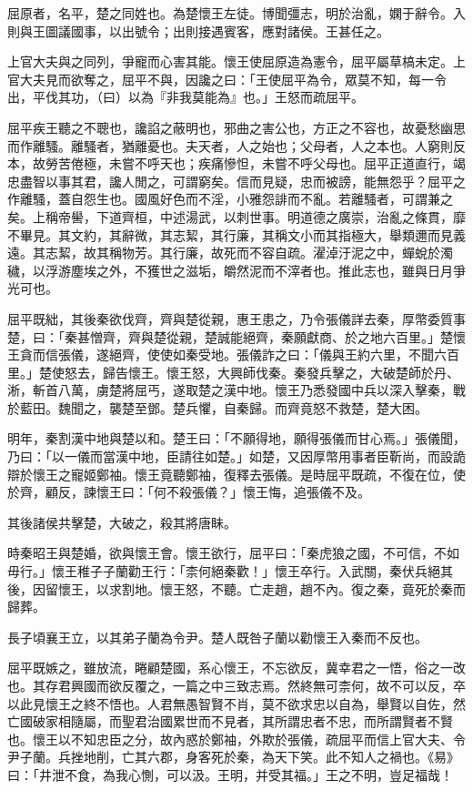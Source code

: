 
\begin{pinyinscope}
屈原者，名平，楚之同姓也。為楚懷王左徒。博聞彊志，明於治亂，嫻于辭令。入則與王圖議國事，以出號令；出則接遇賓客，應對諸侯。王甚任之。

上官大夫與之同列，爭寵而心害其能。懷王使屈原造為憲令，屈平屬草槁未定。上官大夫見而欲奪之，屈平不與，因讒之曰：「王使屈平為令，眾莫不知，每一令出，平伐其功，（曰）以為『非我莫能為』也。」王怒而疏屈平。

屈平疾王聽之不聰也，讒諂之蔽明也，邪曲之害公也，方正之不容也，故憂愁幽思而作離騷。離騷者，猶離憂也。夫天者，人之始也；父母者，人之本也。人窮則反本，故勞苦倦極，未嘗不呼天也；疾痛慘怛，未嘗不呼父母也。屈平正道直行，竭忠盡智以事其君，讒人閒之，可謂窮矣。信而見疑，忠而被謗，能無怨乎？屈平之作離騷，蓋自怨生也。國風好色而不淫，小雅怨誹而不亂。若離騷者，可謂兼之矣。上稱帝嚳，下道齊桓，中述湯武，以刺世事。明道德之廣崇，治亂之條貫，靡不畢見。其文約，其辭微，其志絜，其行廉，其稱文小而其指極大，舉類邇而見義遠。其志絜，故其稱物芳。其行廉，故死而不容自疏。濯淖汙泥之中，蟬蛻於濁穢，以浮游塵埃之外，不獲世之滋垢，皭然泥而不滓者也。推此志也，雖與日月爭光可也。

屈平既絀，其後秦欲伐齊，齊與楚從親，惠王患之，乃令張儀詳去秦，厚幣委質事楚，曰：「秦甚憎齊，齊與楚從親，楚誠能絕齊，秦願獻商、於之地六百里。」楚懷王貪而信張儀，遂絕齊，使使如秦受地。張儀詐之曰：「儀與王約六里，不聞六百里。」楚使怒去，歸告懷王。懷王怒，大興師伐秦。秦發兵擊之，大破楚師於丹、淅，斬首八萬，虜楚將屈丐，遂取楚之漢中地。懷王乃悉發國中兵以深入擊秦，戰於藍田。魏聞之，襲楚至鄧。楚兵懼，自秦歸。而齊竟怒不救楚，楚大困。

明年，秦割漢中地與楚以和。楚王曰：「不願得地，願得張儀而甘心焉。」張儀聞，乃曰：「以一儀而當漢中地，臣請往如楚。」如楚，又因厚幣用事者臣靳尚，而設詭辯於懷王之寵姬鄭袖。懷王竟聽鄭袖，復釋去張儀。是時屈平既疏，不復在位，使於齊，顧反，諫懷王曰：「何不殺張儀？」懷王悔，追張儀不及。

其後諸侯共擊楚，大破之，殺其將唐眛。

時秦昭王與楚婚，欲與懷王會。懷王欲行，屈平曰：「秦虎狼之國，不可信，不如毋行。」懷王稚子子蘭勸王行：「柰何絕秦歡！」懷王卒行。入武關，秦伏兵絕其後，因留懷王，以求割地。懷王怒，不聽。亡走趙，趙不內。復之秦，竟死於秦而歸葬。

長子頃襄王立，以其弟子蘭為令尹。楚人既咎子蘭以勸懷王入秦而不反也。

屈平既嫉之，雖放流，睠顧楚國，系心懷王，不忘欲反，冀幸君之一悟，俗之一改也。其存君興國而欲反覆之，一篇之中三致志焉。然終無可柰何，故不可以反，卒以此見懷王之終不悟也。人君無愚智賢不肖，莫不欲求忠以自為，舉賢以自佐，然亡國破家相隨屬，而聖君治國累世而不見者，其所謂忠者不忠，而所謂賢者不賢也。懷王以不知忠臣之分，故內惑於鄭袖，外欺於張儀，疏屈平而信上官大夫、令尹子蘭。兵挫地削，亡其六郡，身客死於秦，為天下笑。此不知人之禍也。《易》曰：「井泄不食，為我心惻，可以汲。王明，并受其福。」王之不明，豈足福哉！


\end{pinyinscope}
